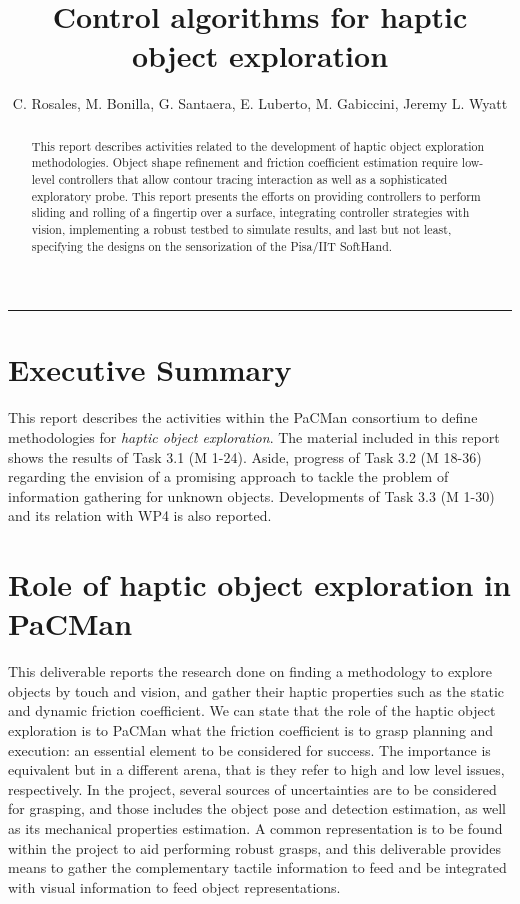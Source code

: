 \documentclass[a4paper,11pt,pdf]{pacmanreport}
\title{Control algorithms for haptic object exploration}
\author{C. Rosales, M. Bonilla, G. Santaera, E. Luberto, M. Gabiccini, Jeremy L. Wyatt}
\begin{document}
\maketitle

\begin{abstract}
\noindent This report describes activities related to the development of haptic object exploration methodologies. Object shape refinement and friction coefficient estimation require low-level controllers that allow contour tracing interaction as well as a sophisticated exploratory probe. This report presents the efforts on providing controllers to perform sliding and rolling of a fingertip over a surface, integrating controller strategies with vision, implementing a robust testbed to simulate results, and last but not least, specifying the designs on the sensorization of the Pisa/IIT SoftHand.
\end{abstract}

\vspace{.2em}
\hrule

\footnotesize

\tableofcontents

\normalsize

\newpage

\section*{Executive Summary}
This report describes the activities within the PaCMan consortium to define methodologies for \emph{haptic object exploration}. The material included in this report shows the results of Task 3.1 (M 1-24). Aside, progress of Task 3.2 (M 18-36) regarding the envision of a promising approach to tackle the problem of information gathering for unknown objects. Developments of Task 3.3 (M 1-30) and its relation with WP4 is also reported.

\section*{Role of haptic object exploration in PaCMan}

This deliverable reports the research done on finding a methodology to explore objects by touch and vision, and gather their haptic properties such as the static and dynamic friction coefficient. We can state that the role of the haptic object exploration is to PaCMan what the friction coefficient is to grasp planning and execution: an essential element to be considered for success. The importance is equivalent but in a different arena, that is they refer to high and low level issues, respectively. In the project, several sources of uncertainties are to be considered for grasping, and those includes the object pose and detection estimation, as well as its mechanical properties estimation. A common representation is to be found within the project to aid performing robust grasps, and this deliverable provides means to gather the complementary tactile information to feed and be integrated with visual information to feed object representations.
\end{document}
